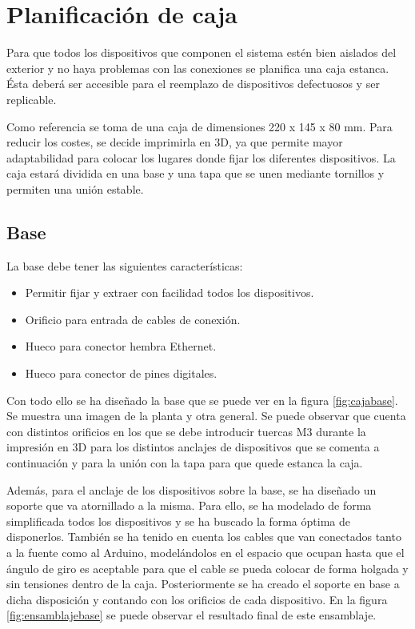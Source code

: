 \chapter{Planificación de caja}\label{chp-04}

Para que todos los dispositivos que componen el sistema estén bien aislados del exterior
y no haya problemas con las conexiones se planifica una caja estanca. Ésta deberá ser 
accesible para el reemplazo de dispositivos defectuosos y ser replicable. 

Como referencia se toma de una caja de dimensiones 220 x 145 x 80 mm. Para reducir los 
costes, se decide imprimirla en 3D, ya que permite mayor adaptabilidad para colocar 
los lugares donde fijar los diferentes dispositivos. La caja estará dividida en una base y una 
tapa que se unen mediante tornillos y permiten una unión estable.

\section{Base}

La base debe tener las siguientes características:
\begin{itemize}
    \item Permitir fijar y extraer con facilidad todos los dispositivos. 
    \item Orificio para entrada de cables de conexión.
    \item Hueco para conector hembra Ethernet.
    \item Hueco para conector de pines digitales.
\end{itemize} 

Con todo ello se ha diseñado la base que se puede ver en la figura \ref{fig:cajabase}. Se muestra
una imagen de la planta y otra general. Se puede observar que cuenta con distintos orificios en los
que se debe introducir tuercas M3 durante la impresión en 3D para los distintos anclajes de dispositivos
que se comenta a continuación y para la unión con la tapa para que quede estanca la caja.

Además, para el anclaje de los dispositivos sobre la base, se ha diseñado un soporte que va atornillado
a la misma. Para ello, se ha modelado de forma simplificada todos los dispositivos y se ha buscado la 
forma óptima de disponerlos. También se ha tenido en cuenta los cables que van conectados tanto a la 
fuente como al Arduino, modelándolos en el espacio que ocupan hasta que el ángulo de giro es aceptable
para que el cable se pueda colocar de forma holgada y sin tensiones dentro de la caja.
Posteriormente se ha creado el soporte en base a dicha disposición y contando con los orificios de cada
dispositivo. En la figura \ref{fig:ensamblajebase} se puede observar el resultado final de este ensamblaje.

